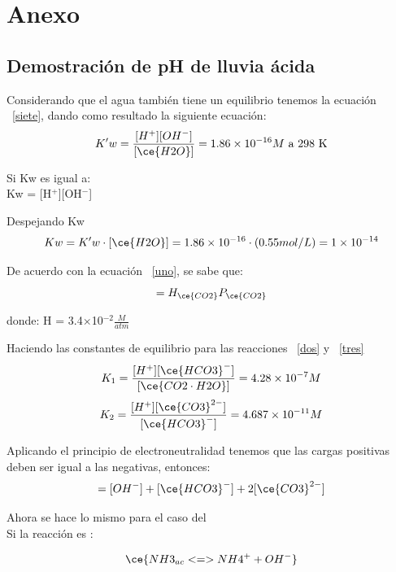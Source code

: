\chapter*{Anexo}

\section {Demostraci\'on de pH de lluvia \'acida}

Considerando que el agua tambi\'en tiene un equilibrio tenemos la ecuaci\'on ~\ref{siete}, dando como resultado la siguiente ecuaci\'on:
\begin{equation*}
K' w =\frac{ [H^+][OH^-]} {[\ce{H2O}]} = 1.86\times10^{-16} M\textrm{     a 298 K}
\end{equation*}

Si Kw es igual a:\\
Kw = [H$^+$][OH$^-$]


Despejando Kw
\begin{equation*}
Kw = K'w\cdot[\ce{H2O}] = 1.86 \times10^{-16}\cdot(0.55mol/L) = 1\times10^{-14}
\end{equation*}


De acuerdo con la ecuaci\'on ~\ref{uno}, se sabe que:
\begin{equation*}
[\ce{CO2 \cdot H2O}] = H_{\ce{CO2}} P_{\ce{CO2}}  
\end{equation*}

donde: H = 3.4$\times$10$^{-2}$$\frac{M}{atm}$

Haciendo las constantes de equilibrio para las reacciones ~\ref{dos} y ~\ref{tres}
\begin{equation*}
K_1 = \frac{[H^+][\ce{HCO3}^-]} {[\ce{CO2\cdot H2O}]} = 4.28\times10^{-7} M
\end{equation*}
\begin{equation*}
K_2 =\frac{[H^+][\ce{CO3}^{2-}]} { [\ce{HCO3}^-]} = 4.687\times10^{-11} M
\end{equation*}


Aplicando el principio de electroneutralidad tenemos que las cargas positivas deben ser igual a las negativas, entonces:
\begin{equation*}
[H^+] = [OH^-]+[\ce{HCO3}^-] +2[\ce{CO3}^{2-}]
\end{equation*}


Ahora se hace lo mismo para el caso del \\
Si la reacci\'on es :

$$\ce{NH3_{ac} <=> NH4^+ + OH^-}$$

